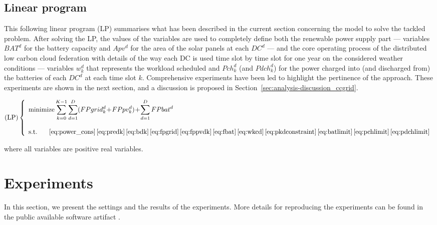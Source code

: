 \subsection{Linear program}

This following linear program (LP) summarises what has been described in the current section concerning the model to solve the tackled problem. After solving the LP, the values of the variables are used to completely define both the renewable power supply part --- variables $BAT^d$ for the battery capacity and $Apv^d$ for the area of the solar panels at each $DC^d$  --- and the core operating process of the distributed low carbon cloud federation with details of the way each DC is used time slot by time slot for one year on the considered weather conditions --- variables $ w_k^d$ that represents the workload scheduled and $Pch^d_k$ (and $Pdch^d_k$) for the power charged into (and discharged from) the batteries of each $DC^d$ at each time slot $k$. Comprehensive experiments have been led to highlight the pertinence of the approach. These experiments are shown in the next section, and a discussion is proposed in Section~\ref{sec:analysis-discussion_ccgrid}.

\begin{equation}\nonumber
    \text{(LP)}\left\{
    \begin{array}{ll}
        \text{minimize}\displaystyle\sum_{k=0}^{K-1}\sum_{d=1}^D (FPgrid^d_k\!+\!FPpv^d_k)\!+\!\sum_{d=1}^D FPbat^d \label{eq:lp}\\ \\
        \text{s.t. } \ \ \ \ 
\eqref{eq:power_cons}\,\eqref{eq:predk}\,\eqref{eq:bdk}\,\eqref{eq:fpgrid}\,\eqref{eq:fppvdk}\,\eqref{eq:fbat}\,\eqref{eq:wkcd}\,\eqref{eq:pkdconstraint}\,\eqref{eq:batlimit}\,\eqref{eq:pchlimit}\,\eqref{eq:pdchlimit} %
    \end{array}
    \right.
\end{equation}

where all variables are positive real variables. 


\section{Experiments}
\label{sec:experiments_ccgrid}

In this section, we present the settings and the results of the
experiments.  More details for reproducing the experiments can be
found in the public available software artifact \cite{artifact_ccgrid}.  %

